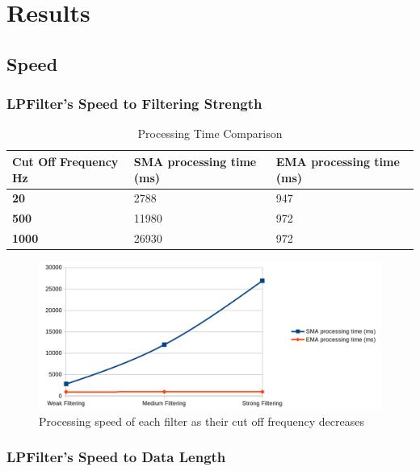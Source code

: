 \chapter{Results}

\section{Speed}

\subsection{LPFilter's Speed to Filtering Strength}

\begin{table}[htbp]
	\centering
	\begin{tabularx}{\textwidth}{|X|X|X|}
		\hline
		\textbf{Cut Off Frequency Hz} & \textbf{SMA processing time (ms)} & \textbf{EMA processing time (ms)} \\ \hline
		\textbf{20} & 2788 & 947 \\ \hline
		\textbf{500} & 11980 & 972 \\ \hline
		\textbf{1000} & 26930 & 972 \\ \hline
	\end{tabularx}
	\caption{Processing Time Comparison}
\end{table}


\begin{figure}[!h]
	\begin{center}
		\includegraphics[width=15cm]{images/GraphSpeedtoFilteringStrength.png}
	\end{center}
	\caption{Processing speed of each filter as their cut off frequency decreases}
\end{figure}

\subsection{LPFilter's Speed to Data Length}

